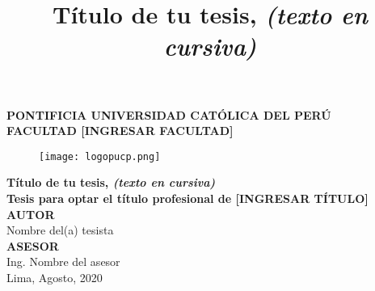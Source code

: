 \clearpage{\pagestyle{empty}\cleardoublepage}
\begin{titlepage}
\begin{center}
 {\Large \bf PONTIFICIA UNIVERSIDAD CATÓLICA DEL PERÚ}\\
  \vspace{8mm} 
  {\Large \bf FACULTAD [INGRESAR FACULTAD]}\\
  \vspace{2cm}
 \begin{figure}[H]
    \centering
    \texttt{[image: logopucp.png]}
\end{figure}
  \vspace{1.5cm}

\title{Título de tu tesis, \textit{(texto en cursiva)}} %
{\Large \bf Título de tu tesis, \textit{(texto en cursiva)}}\\ %
\vspace{1cm}
{\bf Tesis para optar el título profesional de [INGRESAR TÍTULO]}\\[1.0cm]
{\bf AUTOR}\\[0.5cm]
{Nombre del(a) tesista}\\[1.5 cm] %
{\bf ASESOR}\\[0.5 cm] 
{Ing. Nombre del asesor}\\[0.5 cm] %
\vspace{2cm}
{Lima, Agosto, 2020}
\end{center}
\end{titlepage}